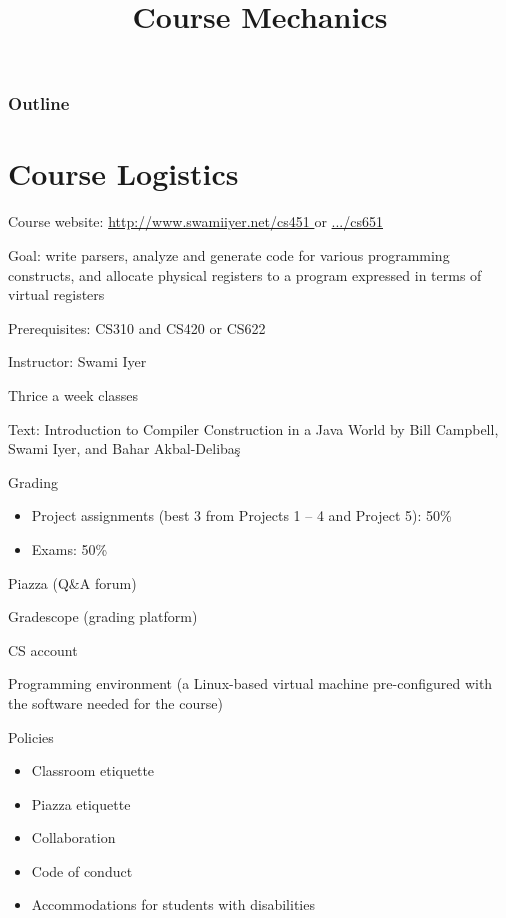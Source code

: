 \documentclass[8pt,a4paper,compress]{beamer}
\title{Course Mechanics}
\date{}
\begin{document}
\begin{frame}
\vfill
\titlepage
\end{frame}

\begin{frame}
\frametitle{Outline}
\tableofcontents
\end{frame}

\section{Course Logistics}
\begin{frame}[fragile]
\pause

Course website: \href{http://www.swamiiyer.net/cs451}{http://www.swamiiyer.net/cs451 \ExternalLink} or \href{http://www.swamiiyer.net/cs651}{.../cs651 \ExternalLink}

\pause
\bigskip

Goal: write parsers, analyze and generate code for various programming constructs, and allocate physical registers to a program expressed in terms of virtual registers

\pause
\bigskip

Prerequisites: CS310 and CS420 or CS622

\pause
\bigskip

Instructor: Swami Iyer

\pause
\bigskip

Thrice a week classes

\pause
\bigskip

Text: Introduction to Compiler Construction in a Java World 
by Bill Campbell, Swami Iyer, and Bahar Akbal-Deliba\c{s}
\end{frame}

\begin{frame}[fragile]
\pause

Grading
\begin{itemize}
\item Project assignments (best 3 from Projects 1 -- 4 and Project 5): 50\%
\item Exams: 50\%
\end{itemize}

\pause
\bigskip

Piazza (Q\&A forum)

\pause
\bigskip

Gradescope (grading platform)

\pause
\bigskip

CS account

\pause
\bigskip

Programming environment (a Linux-based virtual machine pre-configured with the software needed for the course)

\pause
\bigskip

Policies
\begin{itemize}
\item Classroom etiquette
\item Piazza etiquette
\item Collaboration
\item Code of conduct
\item Accommodations for students with disabilities
\end{itemize}
\end{frame}
\end{document}
